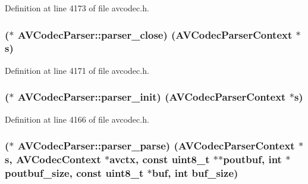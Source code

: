 Definition at line 4173 of file avcodec.\+h.

\subsubsection[{\texorpdfstring{parser\+\_\+close}{parser_close}}]{($\ast$ A\+V\+Codec\+Parser\+::parser\+\_\+close) ({\bf A\+V\+Codec\+Parser\+Context} $\ast${\bf s})}\hypertarget{struct_a_v_codec_parser_a52ff1b3d42b0fc2e9c7982212f8e6c29}{}\label{struct_a_v_codec_parser_a52ff1b3d42b0fc2e9c7982212f8e6c29}


Definition at line 4171 of file avcodec.\+h.

\subsubsection[{\texorpdfstring{parser\+\_\+init}{parser_init}}]{($\ast$ A\+V\+Codec\+Parser\+::parser\+\_\+init) ({\bf A\+V\+Codec\+Parser\+Context} $\ast${\bf s})}\hypertarget{struct_a_v_codec_parser_a5ab163d5b9fa3f1901e96809acd7ed20}{}\label{struct_a_v_codec_parser_a5ab163d5b9fa3f1901e96809acd7ed20}


Definition at line 4166 of file avcodec.\+h.

\subsubsection[{\texorpdfstring{parser\+\_\+parse}{parser_parse}}]{($\ast$ A\+V\+Codec\+Parser\+::parser\+\_\+parse) ({\bf A\+V\+Codec\+Parser\+Context} $\ast${\bf s}, {\bf A\+V\+Codec\+Context} $\ast$avctx, {\bf const} {\bf uint8\+\_\+t} $\ast$$\ast$poutbuf, {\bf int} $\ast$poutbuf\+\_\+size, {\bf const} {\bf uint8\+\_\+t} $\ast${\bf buf}, {\bf int} buf\+\_\+size)}\hypertarget{struct_a_v_codec_parser_a5699fb20c9a821c827a74322ccd529ef}{}\label{struct_a_v_codec_parser_a5699fb20c9a821c827a74322ccd529ef}


